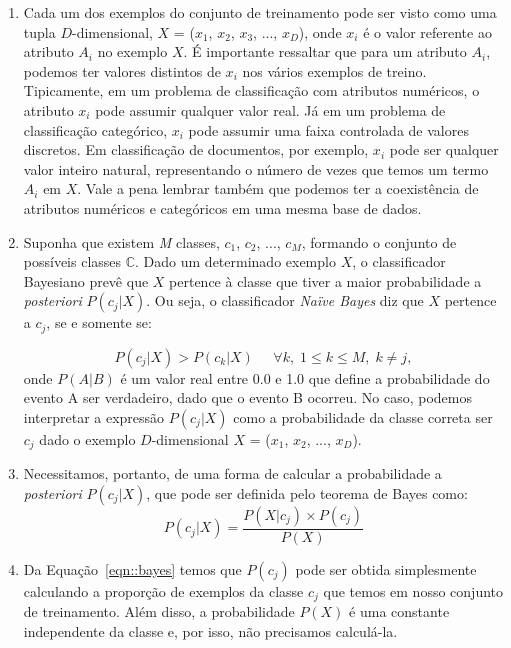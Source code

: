 \begin{enumerate}
    \item Cada um dos exemplos do conjunto de treinamento pode ser visto como uma tupla $D$-dimensional, $X$ = ($x_1$, $x_2$, $x_3$, ..., $x_D$), onde $x_i$ é o valor referente ao atributo $A_i$ no exemplo $X$. É importante ressaltar que para um atributo $A_i$, podemos ter valores distintos de $x_i$ nos vários exemplos de treino. Tipicamente, em um problema de classificação com atributos numéricos, o atributo $x_i$ pode assumir qualquer valor real. Já em um problema de classificação categórico, $x_i$ pode assumir uma faixa controlada de valores discretos. Em classificação de documentos, por exemplo, $x_i$ pode ser qualquer valor inteiro natural, representando o número de vezes que temos um termo $A_i$ em $X$. Vale a pena lembrar também que podemos ter a coexistência de atributos numéricos e categóricos em uma mesma base de dados.
    

    \item Suponha que existem \textit{M} classes, $c_1$, $c_2$, ..., $c_\textit{M}$, formando o conjunto de possíveis classes $\mathbb{C}$. Dado um determinado exemplo $X$, o classificador Bayesiano prevê que $X$ pertence à classe que tiver a maior probabilidade a \textit{posteriori} $P(c_j|X)$. Ou seja, o classificador \textit{Naïve Bayes} diz que $X$ pertence a $c_j$, se e somente se:
        
\begin{equation}\label{eqn::max_pcgivenx}
   P(c_{j}|X) > P(c_{k}|X) \;\;\;\;\;\forall k,\; 1 \le k \le M, \; k \not= j,
\end{equation}
onde $P(A|B)$ é um valor real entre 0.0 e 1.0 que define a probabilidade do evento A ser verdadeiro, dado que o evento B ocorreu. No caso, podemos interpretar a expressão $P(c_j|X)$ como a probabilidade da classe correta ser $c_j$ dado o exemplo $D$-dimensional $X$ = ($x_1$, $x_2$, ..., $x_D$).

    \item Necessitamos, portanto, de uma forma de calcular a probabilidade a \textit{posteriori} $P(c_j| X)$, que pode ser definida pelo teorema de Bayes como:
\begin{equation}\label{eqn::bayes}
   P(c_{j}|X) = \frac{P(X|c_j) \times P(c_j) }{P(X)}
\end{equation}

    \item Da Equação~\ref{eqn::bayes} temos que $P(c_j)$ pode ser obtida simplesmente calculando a proporção de exemplos da classe $c_j$ que temos em nosso conjunto de treinamento. Além disso, a probabilidade $P(X)$ é uma constante independente da classe e, por isso, não precisamos calculá-la.
       

\end{enumerate}

